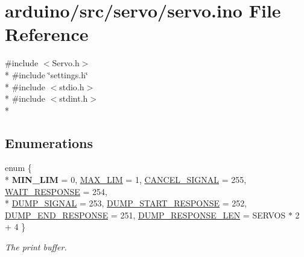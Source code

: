 \hypertarget{servo_8ino}{}\section{arduino/src/servo/servo.ino File Reference}
\label{servo_8ino}
{\ttfamily \#include $<$Servo.\+h$>$}\\*
{\ttfamily \#include \char`\"{}settings.\+h\char`\"{}}\\*
{\ttfamily \#include $<$stdio.\+h$>$}\\*
{\ttfamily \#include $<$stdint.\+h$>$}\\*
\subsection*{Enumerations}
\begin{DoxyCompactItemize}
\item 
enum \{ \\*
{\bfseries M\+I\+N\+\_\+\+L\+I\+M} = 0, 
\hyperlink{servo_8ino_a99fb83031ce9923c84392b4e92f956b5a28384d7634c7976556d681b53a81e140}{M\+A\+X\+\_\+\+L\+I\+M} = 1, 
\hyperlink{servo_8ino_a99fb83031ce9923c84392b4e92f956b5ac997ff2715ad695454398a53eeed31cc}{C\+A\+N\+C\+E\+L\+\_\+\+S\+I\+G\+N\+A\+L} = 255, 
\hyperlink{servo_8ino_a99fb83031ce9923c84392b4e92f956b5ac22157b3832ba05308923fb860925d68}{W\+A\+I\+T\+\_\+\+R\+E\+S\+P\+O\+N\+S\+E} = 254, 
\\*
\hyperlink{servo_8ino_a99fb83031ce9923c84392b4e92f956b5a31cd671c80d04a4acc2d8256ec960c90}{D\+U\+M\+P\+\_\+\+S\+I\+G\+N\+A\+L} = 253, 
\hyperlink{servo_8ino_a99fb83031ce9923c84392b4e92f956b5a51975080564db9aa29bff29cce328b5f}{D\+U\+M\+P\+\_\+\+S\+T\+A\+R\+T\+\_\+\+R\+E\+S\+P\+O\+N\+S\+E} = 252, 
\hyperlink{servo_8ino_a99fb83031ce9923c84392b4e92f956b5aa7ca295335eb71b345d3b0bd0e53277e}{D\+U\+M\+P\+\_\+\+E\+N\+D\+\_\+\+R\+E\+S\+P\+O\+N\+S\+E} = 251, 
\hyperlink{servo_8ino_a99fb83031ce9923c84392b4e92f956b5aebe1616f434c26e10f088aebf559d708}{D\+U\+M\+P\+\_\+\+R\+E\+S\+P\+O\+N\+S\+E\+\_\+\+L\+E\+N} = S\+E\+R\+V\+O\+S $\ast$ 2 + 4
 \}
\begin{DoxyCompactList}\small\item\em The print buffer. \end{DoxyCompactList}\end{DoxyCompactItemize}
